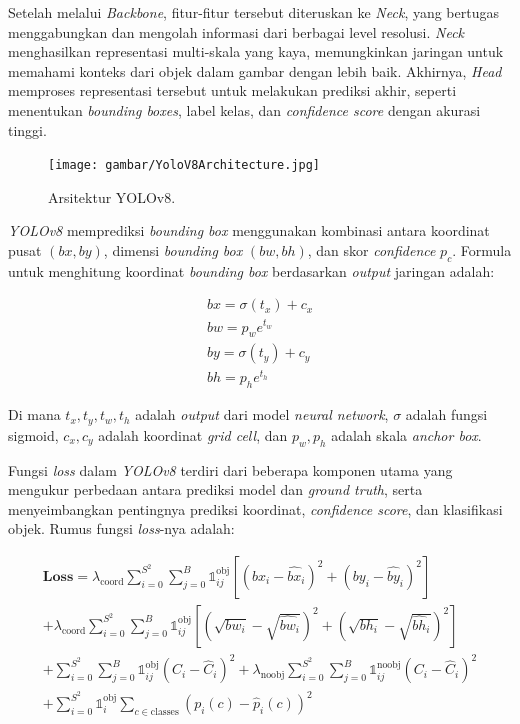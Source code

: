 Setelah melalui \emph{Backbone}, fitur-fitur tersebut diteruskan ke \emph{Neck}, yang bertugas menggabungkan dan mengolah informasi dari berbagai level resolusi. \emph{Neck} menghasilkan representasi multi-skala yang kaya, memungkinkan jaringan untuk memahami konteks dari objek dalam gambar dengan lebih baik. Akhirnya, \emph{Head} memproses representasi tersebut untuk melakukan prediksi akhir, seperti menentukan \emph{bounding boxes}, label kelas, dan \emph{confidence score} dengan akurasi tinggi.

\begin{figure}[H] 
  \centering 
  \texttt{[image: gambar/YoloV8Architecture.jpg]} 
  \caption{Arsitektur YOLOv8.} 
  \label{fig:ArsitekturYOLOv8} 
\end{figure}

\emph{YOLOv8} memprediksi \emph{bounding box} menggunakan kombinasi antara koordinat pusat \((bx, by)\), dimensi \emph{bounding box} \((bw, bh)\), dan skor \emph{confidence} \(p_c\). Formula untuk menghitung koordinat \emph{bounding box} berdasarkan \emph{output} jaringan adalah:

\begin{equation}
  \begin{array}{c}
  bx = \sigma(t_x) + c_x\\
  bw = p_w e^{t_w}\\
  by = \sigma(t_y) + c_y\\ 
  bh = p_h e^{t_h}
  \end{array}
\end{equation}

Di mana \(t_x, t_y, t_w, t_h\) adalah \emph{output} dari model \emph{neural network}, \(\sigma\) adalah fungsi sigmoid, \(c_x, c_y\) adalah koordinat \emph{grid cell}, dan \(p_w, p_h\) adalah skala \emph{anchor box}.

Fungsi \emph{loss} dalam \emph{YOLOv8} terdiri dari beberapa komponen utama yang mengukur perbedaan antara prediksi model dan \emph{ground truth}, serta menyeimbangkan pentingnya prediksi koordinat, \emph{confidence score}, dan klasifikasi objek. Rumus fungsi \emph{loss}-nya adalah:

\begin{equation}
  \begin{array}{c}
  \mathbf{Loss} = \lambda_{\mathrm{coord}} \sum_{i=0}^{S^2} \sum_{j=0}^{B} \mathbb{1}_{ij}^{\mathrm{obj}} \left[ (bx_i - \hat{bx}_i)^2 + (by_i - \hat{by}_i)^2 \right] \\[10pt]
  + \lambda_{\mathrm{coord}} \sum_{i=0}^{S^2} \sum_{j=0}^{B} \mathbb{1}_{ij}^{\mathrm{obj}} \left[ (\sqrt{bw_i} - \sqrt{\hat{bw}_i})^2 + (\sqrt{bh_i} - \sqrt{\hat{bh}_i})^2 \right] \\[10pt]
  + \sum_{i=0}^{S^2} \sum_{j=0}^{B} \mathbb{1}_{ij}^{\mathrm{obj}} (C_i - \hat{C}_i)^2 + \lambda_{\mathrm{noobj}} \sum_{i=0}^{S^2} \sum_{j=0}^{B} \mathbb{1}_{ij}^{\mathrm{noobj}} (C_i - \hat{C}_i)^2 \\[10pt]
  + \sum_{i=0}^{S^2} \mathbb{1}_{i}^{\mathrm{obj}} \sum_{c \in \mathrm{classes}} (p_i(c) - \hat{p}_i(c))^2
  \end{array}
\end{equation}

